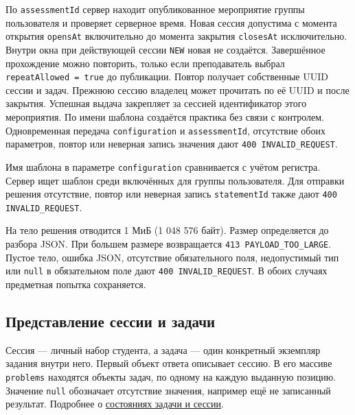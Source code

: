 \documentclass[12pt,a4paper]{article}
\begin{document}
По \texttt{assessmentId} сервер находит опубликованное мероприятие группы пользователя и проверяет серверное время. Новая сессия допустима с момента открытия \texttt{opensAt} включительно до момента закрытия \texttt{closesAt} исключительно. Внутри окна при действующей сессии \texttt{NEW} новая не создаётся. Завершённое прохождение можно повторить, только если преподаватель выбрал \texttt{repeatAllowed\ =\ true} до публикации. Повтор получает собственные UUID сессии и задач. Прежнюю сессию владелец может прочитать по её UUID и после закрытия. Успешная выдача закрепляет за сессией идентификатор этого мероприятия. По имени шаблона создаётся практика без связи с контролем. Одновременная передача \texttt{configuration} и \texttt{assessmentId}, отсутствие обоих параметров, повтор или неверная запись значения дают \texttt{400 INVALID\_\allowbreak{}REQUEST}.

Имя шаблона в параметре \texttt{configuration} сравнивается с учётом регистра. Сервер ищет шаблон среди включённых для группы пользователя. Для отправки решения отсутствие, повтор или неверная запись \texttt{statementId} также дают \texttt{400 INVALID\_\allowbreak{}REQUEST}.

На тело решения отводится 1 МиБ (1 048 576 байт). Размер определяется до разбора JSON. При большем размере возвращается \texttt{413 PAYLOAD\_\allowbreak{}TOO\_\allowbreak{}LARGE}. Пустое тело, ошибка JSON, отсутствие обязательного поля, недопустимый тип или \texttt{null} в обязательном поле дают \texttt{400 INVALID\_\allowbreak{}REQUEST}. В обоих случаях предметная попытка сохраняется.

\subsection{Представление сессии и задачи}\label{ux43fux440ux435ux434ux441ux442ux430ux432ux43bux435ux43dux438ux435-ux441ux435ux441ux441ux438ux438-ux438-ux437ux430ux434ux430ux447ux438}

\hypertarget{представление-сессии-и-задачи}{}

Сессия --- личный набор студента, а задача --- один конкретный экземпляр задания внутри него. Первый объект ответа описывает сессию. В его массиве \texttt{problems} находятся объекты задач, по одному на каждую выданную позицию. Значение \texttt{null} обозначает отсутствие значения, например ещё не записанный результат. Подробнее о {\hyperlink{данные-и-их-жизненный-цикл}{состояниях задачи и сессии}}.
\end{document}
